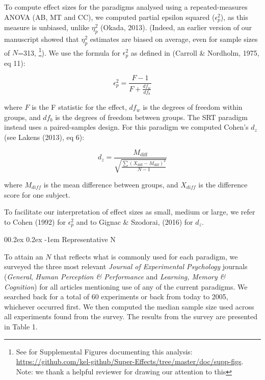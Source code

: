 \documentclass[
  man]{apa6}
\makeatletter
\let\oldparagraph\paragraph
\renewcommand{\paragraph}[1]{\oldparagraph{#1}\mbox{}}
\renewcommand{\paragraph}{\@startsection{paragraph}{4}{\parindent}%
  {0\baselineskip \@plus 0.2ex \@minus 0.2ex}%
  {-1em}%
  {\normalfont\normalsize\bfseries\itshape\typesectitle}}
\makeatother
\begin{document}
To compute effect sizes for the paradigms analysed using a repeated-measures ANOVA (AB, MT and CC), we computed partial epsilon squared (\(\epsilon_{p}^2\)), as this measure is unbiased, unlike \(\eta_{p}^2\) (Okada, 2013). (Indeed, an earlier version of our manuscript showed that \(\eta_{p}^2\) estimates are biased on average, even for sample
sizes of \(N\)=313, \footnote{See for Supplemental Figures documenting this analysis: \url{https://github.com/kel-github/Super-Effects/tree/master/doc/supp-figs}. Note: we thank a helpful reviewer for drawing our attention to this}). We use the formula for \(\epsilon_{p}^2\) as defined in (Carroll \& Nordholm, 1975, eq 11):

\begin{equation}
\epsilon_{p}^{2} = \frac{F-1}{F + \frac{df_w}{df_b}}
\end{equation}

where \(F\) is the F statistic for the effect, \(df_{w}\) is the degrees of freedom within groups, and \(df_{b}\) is the degrees of freedom between groups. The SRT paradigm instead uses a paired-samples design. For this paradigm we computed Cohen's \(d_{z}\) (see Lakens (2013), eq 6):

\begin{equation}
d_{z} = \frac{M_{\mathrm{diff}}}{\sqrt{\frac{\sum(X_{\mathrm{diff}} - M_{\mathrm{diff}})^2}{N-1}}}
\end{equation}

where \(M_{diff}\) is the mean difference between groups, and \(X_{diff}\) is the difference score for one subject.

To facilitate our interpretation of effect sizes as small, medium or large, we refer to Cohen (1992) for \(\epsilon_{p}^2\) and to Gignac \& Szodorai, (2016) for \(d_z\).

\hypertarget{representative-n}{%
\paragraph{Representative N}\label{representative-n}}

To attain an \(N\) that reflects what is commonly used for each paradigm, we surveyed the three most relevant \emph{Journal of Experimental Psychology} journals (\emph{General}, \emph{Human Perception \& Performance} and \emph{Learning, Memory \& Cognition}) for all articles mentioning use of any of the current paradigms. We searched back for a total of 60 experiments or back from today to 2005, whichever occurred first. We then computed the median sample size used across all experiments found from the survey. The results from the survey are presented in Table 1.
\end{document}
